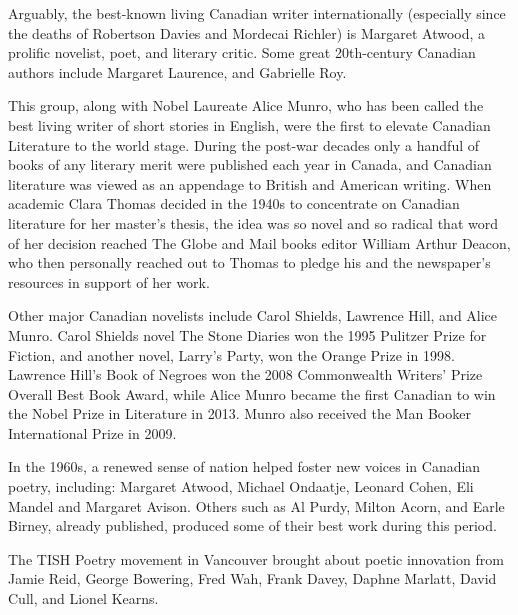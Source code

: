 Arguably, the best-known living Canadian writer internationally
(especially since the deaths of Robertson Davies and Mordecai Richler)
is Margaret Atwood, a prolific novelist, poet, and literary critic. Some
great 20th-century Canadian authors include Margaret Laurence, and
Gabrielle Roy.

This group, along with Nobel Laureate Alice Munro, who has been called
the best living writer of short stories in English, were the first to
elevate Canadian Literature to the world stage. During the post-war
decades only a handful of books of any literary merit were published
each year in Canada, and Canadian literature was viewed as an appendage
to British and American writing. When academic Clara Thomas decided in
the 1940s to concentrate on Canadian literature for her master's thesis,
the idea was so novel and so radical that word of her decision reached
The Globe and Mail books editor William Arthur Deacon, who then
personally reached out to Thomas to pledge his and the newspaper's
resources in support of her work.

Other major Canadian novelists include Carol Shields, Lawrence Hill, and
Alice Munro. Carol Shields novel The Stone Diaries won the 1995 Pulitzer
Prize for Fiction, and another novel, Larry's Party, won the Orange
Prize in 1998. Lawrence Hill's Book of Negroes won the 2008 Commonwealth
Writers' Prize Overall Best Book Award, while Alice Munro became the
first Canadian to win the Nobel Prize in Literature in 2013. Munro also
received the Man Booker International Prize in 2009.

In the 1960s, a renewed sense of nation helped foster new voices in
Canadian poetry, including: Margaret Atwood, Michael Ondaatje, Leonard
Cohen, Eli Mandel and Margaret Avison. Others such as Al Purdy, Milton
Acorn, and Earle Birney, already published, produced some of their best
work during this period.

The TISH Poetry movement in Vancouver brought about poetic innovation
from Jamie Reid, George Bowering, Fred Wah, Frank Davey, Daphne Marlatt,
David Cull, and Lionel Kearns.

